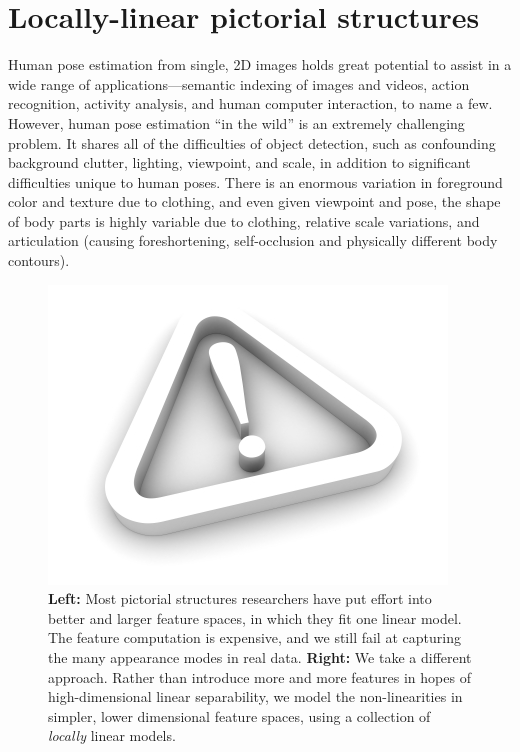 \chapter{Locally-linear pictorial structures}\label{sec:llps}
Human pose estimation from single, 2D images holds great potential to assist in 
a wide range of applications---semantic indexing of images and videos, action 
recognition, activity analysis, and human computer interaction, to name a few.
However, human pose estimation ``in the wild'' is an extremely challenging 
problem.  It shares all of the difficulties of object detection, such as 
confounding background clutter, lighting, viewpoint, and scale, in addition to
significant difficulties unique to human poses.  There is an enormous 
variation in foreground color and texture due to clothing, and even given 
viewpoint and pose, the shape of body parts is highly variable due to clothing, 
relative scale variations, and articulation (causing foreshortening, 
self-occlusion and physically different body contours).

\begin{figure}[t!]
\centering
\includegraphics[width=0.99\linewidth]{figs/empty.jpg}
\caption{\small \label{fig:overview} \textbf{Left:} Most pictorial structures 
researchers have put effort into better and larger feature spaces, in which 
they fit one linear model.  The feature computation is expensive, and we still 
fail at capturing the many appearance modes in real data.  \textbf{Right:} We 
take a different approach.  Rather than introduce more and more features in 
hopes of high-dimensional linear separability, we model the non-linearities in 
simpler, lower dimensional feature spaces, using a collection of {\em locally} 
linear models.}
\end{figure}


